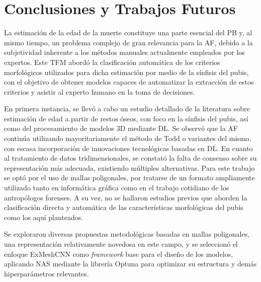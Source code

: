 \chapter{Conclusiones y Trabajos Futuros}

La estimación de la edad de la muerte constituye una parte esencial del PB y, al mismo tiempo, un problema complejo de gran relevancia para la AF, debido a la subjetividad inherente a los métodos manuales actualmente empleados por los expertos. Este TFM abordó la clasificación automática de los criterios morfológicos utilizados para dicha estimación por medio de la sínfisis del pubis, con el objetivo de obtener modelos capaces de automatizar la extracción de estos criterios y asistir al experto humano en la toma de decisiones.

En primera instancia, se llevó a cabo un estudio detallado de la literatura sobre estimación de edad a partir de restos óseos, con foco en la sínfisis del pubis, así como del procesamiento de modelos 3D mediante DL. Se observó que la AF continúa utilizando mayoritariamente el método de Todd \cite{RefWorks:RefID:19-todd1921age} o variantes del mismo, con escasa incorporación de innovaciones tecnológicas basadas en DL. En cuanto al tratamiento de datos tridimensionales, se constató la falta de consenso sobre su representación más adecuada, existiendo múltiples alternativas. Para este trabajo se optó por el uso de mallas poligonales, por tratarse de un formato ampliamente utilizado tanto en informática gráfica como en el trabajo cotidiano de los antropólogos forenses. A su vez, no se hallaron estudios previos que aborden la clasificación directa y automática de las características morfológicas del pubis como los aquí planteados.

Se exploraron diversas propuestas metodológicas basadas en mallas poligonales, una representación relativamente novedosa en este campo, y se seleccionó el enfoque ExMeshCNN como \textit{framework} base para el diseño de los modelos, aplicando NAS mediante la librería Optuna \cite{optuna_2019} para optimizar su estructura y demás hiperparámetros relevantes.

